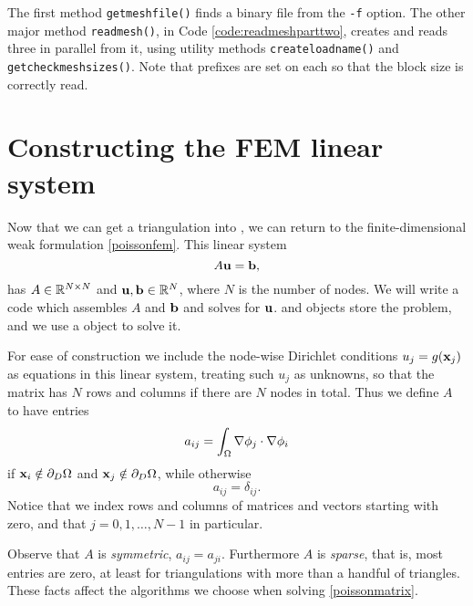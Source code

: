 The first method \texttt{getmeshfile()} finds a \PETSc binary file from the \texttt{-f} option.  The other major method \texttt{readmesh()}, in Code \ref{code:readmeshparttwo}, creates and reads three \pVecs in parallel from it, using utility methods \texttt{createloadname()} and \texttt{getcheckmeshsizes()}.  Note that prefixes are set on each \pVec so that the block size is correctly read.




\section{Constructing the FEM linear system}

Now that we can get a triangulation into \PETSc, we can return to the finite-dimensional weak formulation \eqref{poissonfem}.  This linear system
\begin{equation}
A \mathbf{u} = \mathbf{b}, \label{poissonmatrix}
\end{equation}
has $A\in\mathbb{R}^{N\times N}$ and $\mathbf{u},\mathbf{b}\in\mathbb{R}^N$, where $N$ is the number of nodes.  We will write a code which assembles $A$ and $\mathbf{b}$ and solves for $\mathbf{u}$.  \PETSc \pMat and \pVec objects store the problem, and we use a \pKSP object to solve it.

For ease of construction we include the node-wise Dirichlet conditions $u_j=g(\mathbf{x}_j)$ as equations in this linear system, treating such $u_j$ as unknowns, so that the matrix has $N$ rows and columns if there are $N$ nodes in total.  Thus we define $A$ to have entries
\begin{equation}
a_{ij} = \int_\Omega \nabla \phi_j \cdot \nabla \phi_i \label{Aentryfem}
\end{equation}
if $\mathbf{x}_i \notin \partial_D \Omega$ and $\mathbf{x}_j \notin \partial_D \Omega$, while otherwise
\begin{equation*}
a_{ij} = \delta_{ij}.
\end{equation*}
Notice that we index rows and columns of matrices and vectors starting with zero, and that $j=0,1,\dots,N-1$ in particular.

Observe that $A$ is \emph{symmetric}, $a_{ij}=a_{ji}$.  Furthermore $A$ is \emph{sparse}, that is, most entries are zero, at least for triangulations with more than a handful of triangles.  These facts affect the algorithms we choose when solving \eqref{poissonmatrix}.

